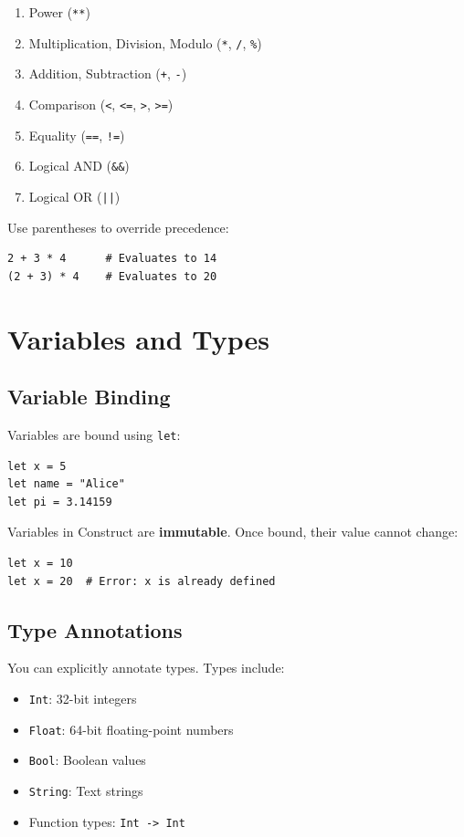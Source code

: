\documentclass[11pt,twoside,openright]{book}
\begin{document}
\begin{enumerate}
    \item Power (\texttt{**})
    \item Multiplication, Division, Modulo (\texttt{*}, \texttt{/}, \texttt{\%})
    \item Addition, Subtraction (\texttt{+}, \texttt{-})
    \item Comparison (\texttt{<}, \texttt{<=}, \texttt{>}, \texttt{>=})
    \item Equality (\texttt{==}, \texttt{!=})
    \item Logical AND (\texttt{\&\&})
    \item Logical OR (\texttt{||})
\end{enumerate}

Use parentheses to override precedence:

\begin{lstlisting}[language=ConstructLang]
2 + 3 * 4      # Evaluates to 14
(2 + 3) * 4    # Evaluates to 20
\end{lstlisting}

\chapter{Variables and Types}

\section{Variable Binding}

Variables are bound using \texttt{let}:

\begin{lstlisting}[language=ConstructLang]
let x = 5
let name = "Alice"
let pi = 3.14159
\end{lstlisting}

Variables in Construct are \textbf{immutable}. Once bound, their value cannot change:

\begin{lstlisting}[language=ConstructLang]
let x = 10
let x = 20  # Error: x is already defined
\end{lstlisting}

\section{Type Annotations}

You can explicitly annotate types. Types include:

\begin{itemize}
    \item \texttt{Int}: 32-bit integers
    \item \texttt{Float}: 64-bit floating-point numbers
    \item \texttt{Bool}: Boolean values
    \item \texttt{String}: Text strings
    \item Function types: \texttt{Int -> Int}
\end{itemize}
\end{document}
